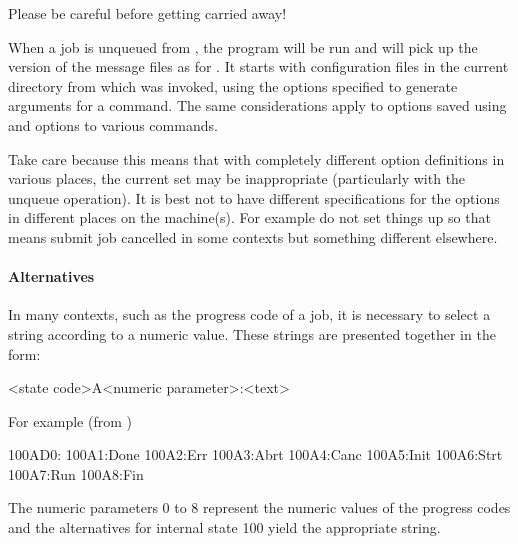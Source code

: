 Please be careful before getting carried away!

When a job is unqueued from \PrBtq{}, the program  will be run and will pick up the version of the message files as for \PrBtr{}. It starts with configuration files in the current directory from which \PrBtq{} was invoked, using the options specified to
generate arguments for a \PrBtr{} command. The same considerations apply to options saved using
 and  options to various commands.

Take care because this means that with completely different option definitions in various places, the current set may be inappropriate
(particularly with the unqueue operation). It is best not to have different specifications for the options in different places on the
machine(s). For example do not set things up so that  means submit job cancelled in some
contexts but something different elsewhere.

\paragraph{Alternatives}
In many contexts, such as the progress code of a job, it is necessary to select a string according to a numeric value. These strings are
presented together in the form:

\begin{expara}

{\textless}state code{\textgreater}A{\textless}numeric
parameter{\textgreater}:{\textless}text{\textgreater}

\end{expara}

For example (from )

\begin{expara}

100AD0:\newline
100A1:Done\newline
100A2:Err\newline
100A3:Abrt\newline
100A4:Canc\newline
100A5:Init\newline
100A6:Strt\newline
100A7:Run\newline
100A8:Fin

\end{expara}

The numeric parameters 0 to 8 represent the numeric values of the progress codes and the alternatives for internal state 100 yield the
appropriate string.

